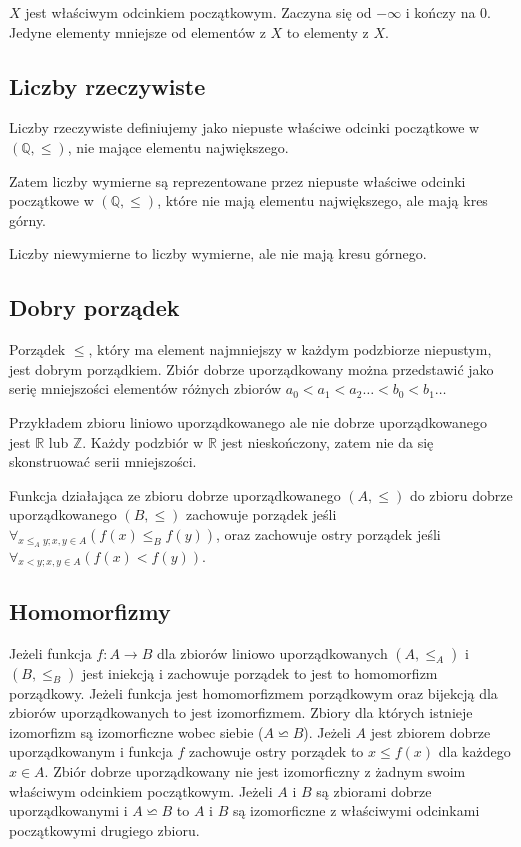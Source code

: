 \documentclass{../notatki}
\begin{document}
$X$ jest właściwym odcinkiem początkowym. Zaczyna się od $-\infty$ i kończy na
0. Jedyne elementy mniejsze od elementów z $X$ to elementy z $X$.

\subsection{Liczby rzeczywiste}

Liczby rzeczywiste definiujemy jako niepuste właściwe odcinki początkowe w
$(\mathbb{Q}, \le)$, nie mające elementu największego.

Zatem liczby wymierne są reprezentowane przez niepuste właściwe odcinki
początkowe w $(\mathbb{Q}, \le)$, które nie mają elementu największego, ale
mają kres górny.

Liczby niewymierne to liczby wymierne, ale nie mają kresu górnego.

\subsection{Dobry porządek}

Porządek $\le$, który ma element najmniejszy w każdym podzbiorze niepustym, jest
dobrym porządkiem. Zbiór dobrze uporządkowany można przedstawić jako serię
mniejszości elementów różnych zbiorów $a_0<a_1<a_2\dots<b_0<b_1\dots$

Przykładem zbioru liniowo uporządkowanego ale nie dobrze uporządkowanego jest
$\mathbb{R}$ lub $\mathbb{Z}$. Każdy podzbiór w $\mathbb{R}$ jest nieskończony,
zatem nie da się skonstruować serii mniejszości.

Funkcja działająca ze zbioru dobrze uporządkowanego $(A, \le)$ do zbioru dobrze
uporządkowanego $(B, \le)$ zachowuje porządek jeśli $\forall_{x \le_A
y; x,y \in A}(f(x) \le_B f(y))$, oraz zachowuje ostry porządek jeśli $\forall_{x
< y; x,y \in A}(f(x) < f(y))$.

\subsection{Homomorfizmy}

Jeżeli funkcja $f: A \rightarrow B$ dla zbiorów liniowo uporządkowanych $(A,
\le_A)$ i $(B, \le_B)$ jest iniekcją i zachowuje porządek to jest to
homomorfizm porządkowy. Jeżeli funkcja jest homomorfizmem porządkowym oraz
bijekcją dla zbiorów uporządkowanych to jest izomorfizmem. Zbiory dla których
istnieje izomorfizm są izomorficzne wobec siebie ($A \backsimeq B$).
Jeżeli $A$ jest
zbiorem dobrze uporządkowanym i funkcja $f$ zachowuje ostry porządek
to $x \le f(x)$ dla każdego $x \in A$. Zbiór dobrze uporządkowany nie
jest izomorficzny z żadnym swoim właściwym odcinkiem początkowym.
Jeżeli $A$ i $B$ są zbiorami dobrze uporządkowanymi i $A \backsimeq
B$ to $A$ i $B$ są izomorficzne z właściwymi odcinkami początkowymi
drugiego zbioru.
\end{document}
